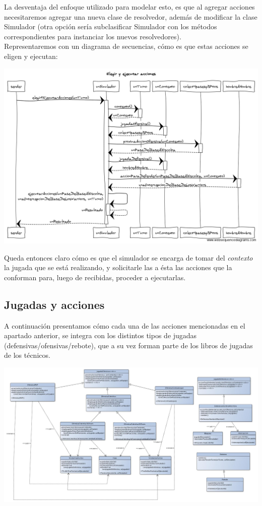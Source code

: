 La desventaja del enfoque utilizado para modelar esto, es que al agregar acciones necesitaremos agregar una nueva clase de resolvedor, además de modificar la clase Simulador (otra opción sería subclasificar Simulador con los métodos correspondientes para instanciar los nuevos resolvedores).\\


Representaremos con un diagrama de secuencias, cómo es que estas acciones se eligen y ejecutan:
\begin{center}
\includegraphics[scale=0.4]{diseno/Elegir_y_ejecutar_acciones.png}
\end{center}
Queda entonces claro cómo es que el simulador se encarga de tomar del \textit{contexto} la jugada que se está realizando, y solicitarle las a ésta las acciones que la conforman para, luego de recibidas, proceder a ejecutarlas.

\subsection{Jugadas y acciones}
A continuación presentamos cómo cada una de las acciones mencionadas en el apartado anterior, se integra con los distintos tipos de jugadas (defensivas/ofensivas/rebote), que a su vez forman parte de los libros de jugadas de los técnicos.

\begin{center}
\includegraphics[scale=0.4, angle=90]{diseno/jugadasYAcciones.jpg}
\end{center}


